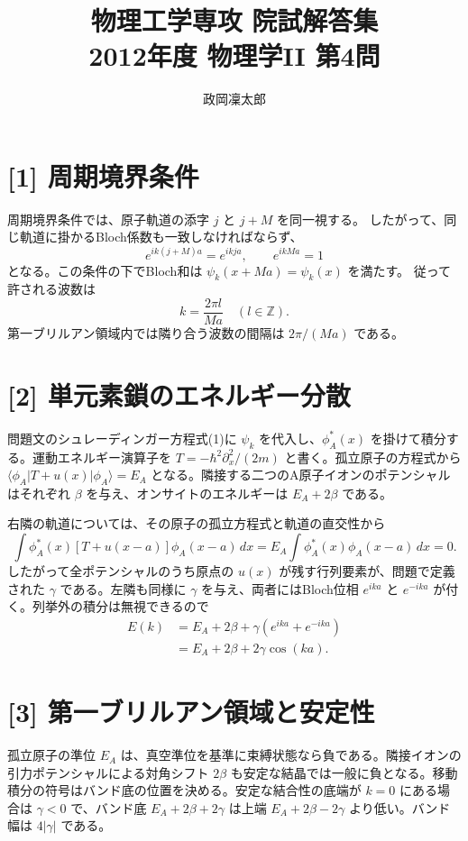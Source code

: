 \documentclass[11pt,a4paper]{article}
\title{物理工学専攻 院試解答集\\2012年度 物理学II 第4問}
\author{政岡凜太郎}
\date{}
\begin{document}
\maketitle

\section*{[1] 周期境界条件}
周期境界条件では、原子軌道の添字 $j$ と $j+M$ を同一視する。
したがって、同じ軌道に掛かるBloch係数も一致しなければならず、
\begin{equation}
  e^{ik(j+M)a}=e^{ikja},\qquad e^{ikMa}=1
\end{equation}
となる。この条件の下でBloch和は $\psi_k(x+Ma)=\psi_k(x)$ を満たす。
従って許される波数は
\begin{equation}
  \boxed{k=\frac{2\pi l}{Ma}\quad(l\in\mathbb Z)}.
\end{equation}
第一ブリルアン領域内では隣り合う波数の間隔は $2\pi/(Ma)$ である。

\section*{[2] 単元素鎖のエネルギー分散}
問題文のシュレーディンガー方程式(1)に $\psi_k$ を代入し、$\phi_A^*(x)$ を掛けて積分する。運動エネルギー演算子を $T=-\hbar^2\partial_x^2/(2m)$ と書く。孤立原子の方程式から $\langle\phi_A|T+u(x)|\phi_A\rangle=E_A$ となる。隣接する二つのA原子イオンのポテンシャルはそれぞれ $\beta$ を与え、オンサイトのエネルギーは $E_A+2\beta$ である。

右隣の軌道については、その原子の孤立方程式と軌道の直交性から
\begin{equation}
 \int\phi_A^*(x)[T+u(x-a)]\phi_A(x-a)\,dx
 =E_A\int\phi_A^*(x)\phi_A(x-a)\,dx=0.
\end{equation}
したがって全ポテンシャルのうち原点の $u(x)$ が残す行列要素が、問題で定義された $\gamma$ である。左隣も同様に $\gamma$ を与え、両者にはBloch位相 $e^{ika}$ と $e^{-ika}$ が付く。列挙外の積分は無視できるので
\begin{align}
  E(k)&=E_A+2\beta+\gamma(e^{ika}+e^{-ika})\\
      &=\boxed{E_A+2\beta+2\gamma\cos(ka)}.
\end{align}

\section*{[3] 第一ブリルアン領域と安定性}
孤立原子の準位 $E_A$ は、真空準位を基準に束縛状態なら負である。隣接イオンの引力ポテンシャルによる対角シフト $2\beta$ も安定な結晶では一般に負となる。移動積分の符号はバンド底の位置を決める。安定な結合性の底端が $k=0$ にある場合は $\gamma<0$ で、バンド底 $E_A+2\beta+2\gamma$ は上端 $E_A+2\beta-2\gamma$ より低い。バンド幅は $4|\gamma|$ である。
\end{document}

